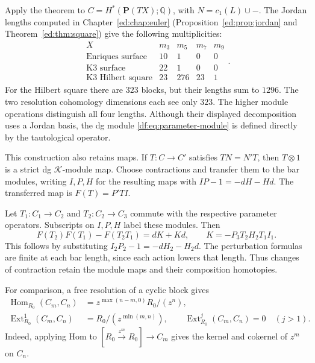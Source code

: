 Apply the theorem to $C=H^*(\mathbf P(TX);\mathbb Q)$, with
$N=c_1(L)\cup-$. The Jordan lengths computed in
Chapter~\ref{ed:chap:euler} (Proposition~\ref{ed:prop:jordan} and
Theorem~\ref{ed:thm:square}) give the following multiplicities:
\begin{equation}\label{df:eq:module-table}
 \begin{array}{c|rrrr}
  X&m_3&m_5&m_7&m_9\\ \hline
  \text{Enriques surface}&10&1&0&0\\
  \text{K3 surface}&22&1&0&0\\
  \text{K3 Hilbert square}&23&276&23&1
 \end{array}.
\end{equation}
For the Hilbert square there are $323$ blocks, but their lengths sum
to $1296$. The two resolution cohomology dimensions each see only
$323$. The higher module operations distinguish all four lengths.
Although their displayed decomposition uses a Jordan basis,
the dg module \eqref{df:eq:parameter-module} is defined directly
by the tautological operator.

This construction also retains maps. If $T:C\to C'$ satisfies
$TN=N'T$, then $T\otimes1$ is a strict dg $\mathcal K$-module map.
Choose contractions and transfer them to the bar modules, writing
$I,P,H$ for the resulting maps with $IP-1=-dH-Hd$.
The transferred map is $F(T)=P'TI$.

Let $T_1:C_1\to C_2$ and $T_2:C_2\to C_3$ commute with the respective
parameter operators. Subscripts on $I,P,H$ label these modules. Then
\begin{equation}\label{df:eq:composition-homotopy}
 F(T_2)F(T_1)-F(T_2T_1)=dK+Kd,
 \qquad K=-P_3T_2H_2T_1I_1.
\end{equation}
This follows by substituting $I_2P_2-1=-dH_2-H_2d$.
The perturbation formulas are finite at each bar length, since each
action lowers that length. Thus changes of contraction retain the
module maps and their composition homotopies.

For comparison, a free resolution of a cyclic block gives
\begin{equation}\label{df:eq:block-hom}
 \begin{split}
 \operatorname{Hom}_{R_0}(C_m,C_n)
   &=z^{\max(n-m,0)}R_0/(z^n),\\
 \operatorname{Ext}_{R_0}^1(C_m,C_n)
   &=R_0/(z^{\min(m,n)}),\qquad
 \operatorname{Ext}_{R_0}^{j}(C_m,C_n)=0\quad(j>1).
 \end{split}
\end{equation}
Indeed, applying Hom to
$[R_0\xrightarrow{z^m}R_0]\to C_m$ gives the kernel and cokernel
of $z^m$ on $C_n$.

